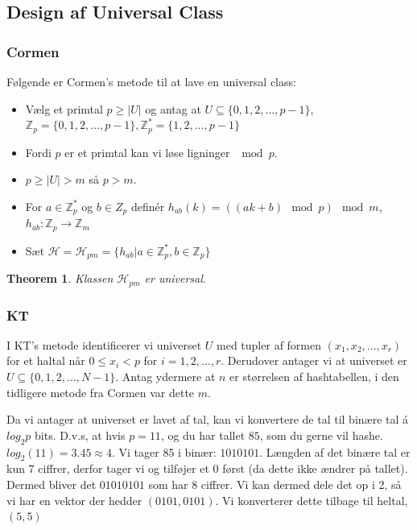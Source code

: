 \documentclass[11pt]{article}
\newtheorem{theorem}{Theorem}
\theoremstyle{definition}
\theoremstyle{remark}
\begin{document}
\subsection{Design af Universal Class}

\subsubsection{Cormen}

Følgende er Cormen's metode til at lave en universal class:

\begin{itemize}
\item Vælg et primtal $p \geq |U|$ og antag at $U \subseteq \{0, 1, 2, \ldots, p-1\}$, $\mathbb{Z}_{p} = \{0,1,2, \ldots, p-1\}, \mathbb{Z}_{p}^{*} = \{1, 2, \ldots, p-1\}$
\item Fordi $p$ er et primtal kan vi løse ligninger $\mod p$.
\item $p \geq |U| > m$ så $p > m$.
\item For $a \in \mathbb{Z}_{p}^{*}$ og $b \in Z_{p}$ definér $h_{ab}(k) = ((ak+b) \mod p) \mod m$, $h_{ab} : \mathbb{Z}_{p} \rightarrow \mathbb{Z}_{m}$
\item Sæt $\mathcal{H} = \mathcal{H}_{pm} = \{h_{ab} | a \in \mathbb{Z}_{p}^{*}, b \in \mathbb{Z}_{p}\}$
\end{itemize}


\begin{theorem}
  Klassen $\mathcal{H}_{pm}$ er universal.
\end{theorem}


\subsubsection{KT}

I KT's metode identificerer vi universet $U$ med tupler af formen $(x_{1}, x_{2}, \ldots, x_{r})$ for et haltal når $0 \leq x_{i} < p$ for $i = 1, 2, \ldots, r$. Derudover antager vi at universet er $U \subseteq \{0, 1, 2, \ldots, N-1\}$. Antag ydermere at $n$ er størrelsen af hashtabellen, i den tidligere metode fra Cormen var dette $m$.

Da vi antager at universet er lavet af tal, kan vi konvertere de tal til binære tal á $log_{2}p$ bits. D.v.s, at hvis $p = 11$, og du har tallet $85$, som du gerne vil hashe. $log_{2}(11) = 3.45 \approx 4$. Vi tager 85 i binær: $1010101$. Længden af det binære tal er kun 7 ciffrer, derfor tager vi og tilføjer et 0 først (da dette ikke ændrer på tallet). Dermed bliver det $01010101$ som har 8 ciffrer. Vi kan dermed dele det op i 2, så vi har en vektor der hedder $(0101, 0101)$. Vi konverterer dette tilbage til heltal, $(5,5)$
\end{document}
